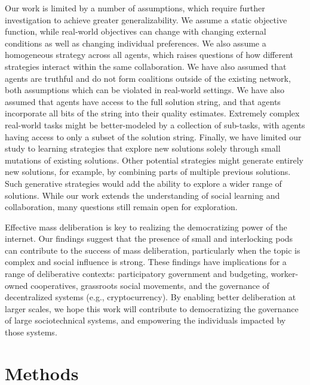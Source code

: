 \documentclass[twocolumn,10pt]{article}
\begin{document}
Our work is limited by a number of assumptions, which require further investigation to achieve greater generalizability. We assume a static objective function, while real-world objectives can change with changing external conditions as well as changing individual preferences. We also assume a homogeneous strategy across all agents, which raises questions of how different strategies interact within the same collaboration. We have also assumed that agents are truthful and do not form coalitions outside of the existing network, both assumptions which can be violated in real-world settings.
We have also assumed that agents have access to the full solution string, and that agents incorporate all bits of the string into their quality estimates. Extremely complex real-world tasks might be better-modeled by a collection of sub-tasks, with agents having access to only a subset of the solution string.
Finally, we have limited our study to learning strategies that explore new solutions solely through small mutations of existing solutions. Other potential strategies might generate entirely new solutions, for example, by combining parts of multiple previous solutions. Such generative strategies would add the ability to explore a wider range of solutions. While our work extends the understanding of social learning and collaboration, many questions still remain open for exploration.

Effective mass deliberation is key to realizing the democratizing power of the internet. Our findings suggest that the presence of small and interlocking pods can contribute to the success of mass deliberation, particularly when the topic is complex and social influence is strong. These findings have implications for a range of deliberative contexts: participatory government and budgeting, worker-owned cooperatives, grassroots social movements, and the governance of decentralized systems (e.g., cryptocurrency). By enabling better deliberation at larger scales, we hope this work will contribute to democratizing the governance of large sociotechnical systems, and empowering the individuals impacted by those systems.

\section{Methods}
\end{document}
